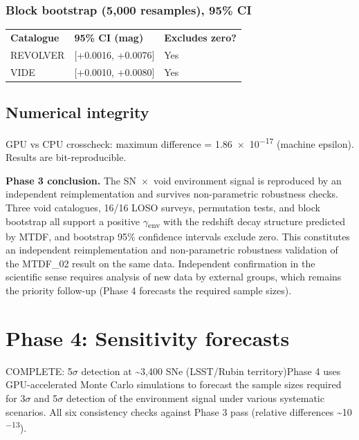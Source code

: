 \documentclass[11pt,a4paper]{article}
\begin{document}
\subsubsection{Block bootstrap (5,000 resamples), 95\% CI}
\begin{table}[H]
\centering
\footnotesize
\begin{tabularx}{\linewidth}{l>{\RaggedRight\arraybackslash}X>{\RaggedRight\arraybackslash}X}
\toprule
\textbf{Catalogue} & \textbf{95\% CI (mag)} & \textbf{Excludes zero?} \tabularnewline
REVOLVER & {}[+0.0016, +0.0076] & Yes \tabularnewline
VIDE & {}[+0.0010, +0.0080] & Yes \tabularnewline
\bottomrule
\end{tabularx}
\end{table}

\subsection{Numerical integrity}
GPU vs CPU crosscheck: maximum difference = 1.86~$\times$~10\textsuperscript{$-$17} (machine epsilon). Results are bit-reproducible.

\begin{mdframed}[linecolor=accent,linewidth=0.5pt,backgroundcolor=callout-bg,leftline=true,rightline=true,topline=true,bottomline=true,innerleftmargin=8pt,innerrightmargin=8pt,innertopmargin=6pt,innerbottommargin=6pt]
\textbf{Phase 3 conclusion.}
The SN~$\times$~void environment signal is reproduced by an independent reimplementation and survives non-parametric robustness checks. Three void catalogues, 16/\allowbreak{}16 LOSO surveys, permutation tests, and block bootstrap all support a positive $\gamma$\textsubscript{env} with the redshift decay structure predicted by MTDF, and bootstrap 95\% confidence intervals exclude zero. This constitutes an independent reimplementation and non-parametric robustness validation of the MTDF\_\allowbreak{}02 result on the same data. Independent confirmation in the scientific sense requires analysis of new data by external groups, which remains the priority follow-up (Phase 4 forecasts the required sample sizes).
\end{mdframed}

\section{Phase 4: Sensitivity forecasts}
\label{sec:sec5}
COMPLETE: 5$\sigma$ detection at \~{}3,400 SNe (LSST/\allowbreak{}Rubin territory)Phase 4 uses GPU-accelerated Monte Carlo simulations to forecast the sample sizes required for 3$\sigma$ and 5$\sigma$ detection of the environment signal under various systematic scenarios. All six consistency checks against Phase 3 pass (relative differences \~{}10\textsuperscript{$-$13}).
\end{document}
